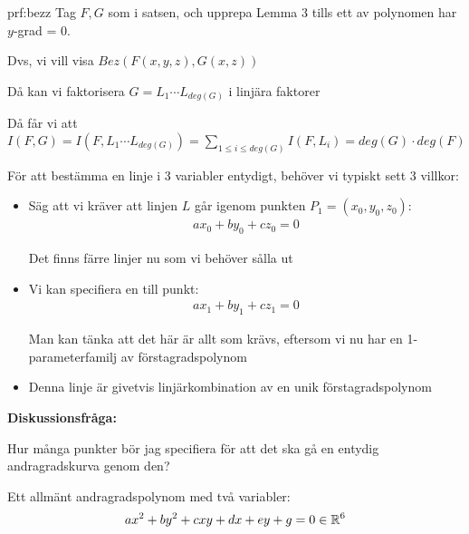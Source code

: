 \newpage
\begin{prf}{prf:bezz}
  Tag $F,G$ som i satsen, och upprepa Lemma 3 tills ett av polynomen har $y$-grad = 0.\par
  \noindent Dvs, vi vill visa $Bez(F(x,y,z), G(x,z))$
  \par\bigskip
  \noindent Då kan vi faktorisera $G = L_1\cdots L_{deg(G)}$ i linjära faktorer\par\bigskip
  \noindent Då får vi att $I(F,G) = I(F,L_1\cdots L_{deg(G)}) = \sum_{1\leq i\leq deg(G)}I(F,L_i)=deg(G)\cdot deg(F)$
\end{prf}
\par\bigskip
\noindent För att bestämma en linje i 3 variabler entydigt, behöver vi typiskt sett 3 villkor:
\begin{itemize}
  \item  Säg att vi kräver att linjen $L$ går igenom punkten $P_1 = (x_0,y_0,z_0)$:
    \begin{equation*}
      \begin{gathered}
        ax_0+by_0+cz_0=0
      \end{gathered}
    \end{equation*}\par
    \noindent Det finns färre linjer nu som vi behöver sålla ut
  \item Vi kan specifiera en till punkt:
    \begin{equation*}
      \begin{gathered}
        ax_1+by_1+cz_1=0
      \end{gathered}
    \end{equation*}\par
    \noindent Man kan tänka att det här är allt som krävs, eftersom vi nu har en 1-parameterfamilj av förstagradspolynom 
  \item Denna linje är givetvis linjärkombination av en unik förstagradspolynom 
\end{itemize}
\par\bigskip
\noindent\textbf{Diskussionsfråga:}\par
\noindent Hur många punkter bör jag specifiera för att det ska gå en entydig andragradskurva genom den?
\par\bigskip
\noindent Ett allmänt andragradspolynom med två variabler:
\begin{equation*}
  \begin{gathered}
    ax^2+by^2+cxy+dx+ey+g=0\in\mathbb{R}^6
  \end{gathered}
\end{equation*}\par
